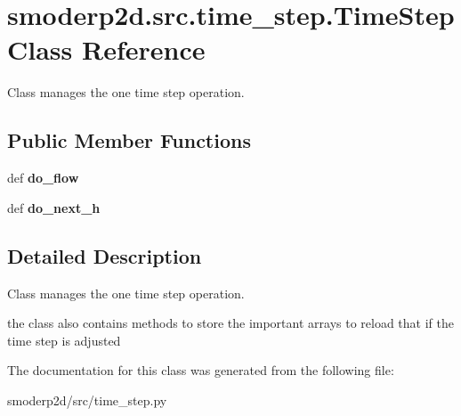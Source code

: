 \hypertarget{classsmoderp2d_1_1src_1_1time__step_1_1TimeStep}{\section{smoderp2d.\-src.\-time\-\_\-step.\-Time\-Step Class Reference}
\label{classsmoderp2d_1_1src_1_1time__step_1_1TimeStep}
}


Class manages the one time step operation.  


\subsection*{Public Member Functions}
\begin{DoxyCompactItemize}
\item 
\hypertarget{classsmoderp2d_1_1src_1_1time__step_1_1TimeStep_ae256e735639ddea75ec60804b91d8d7a}{def {\bfseries do\-\_\-flow}}\label{classsmoderp2d_1_1src_1_1time__step_1_1TimeStep_ae256e735639ddea75ec60804b91d8d7a}

\item 
\hypertarget{classsmoderp2d_1_1src_1_1time__step_1_1TimeStep_af9c42120993834afb4318d35cbedd47e}{def {\bfseries do\-\_\-next\-\_\-h}}\label{classsmoderp2d_1_1src_1_1time__step_1_1TimeStep_af9c42120993834afb4318d35cbedd47e}

\end{DoxyCompactItemize}


\subsection{Detailed Description}
Class manages the one time step operation. 

the class also contains methods to store the important arrays to reload that if the time step is adjusted 

The documentation for this class was generated from the following file\-:\begin{DoxyCompactItemize}
\item 
smoderp2d/src/time\-\_\-step.\-py\end{DoxyCompactItemize}
